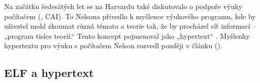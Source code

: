Na začátku šedesátých let se na Harvardu také diskutovalo o podpoře výuky počítačem (, CAI). To Nelsona přivedlo k myšlence výukového programu, kde by uživatel mohl zkoumat různá témata a teorie tak, že by procházel síť informací -- „program tisíce teorií.“ Tento koncept pojmenoval jako „hypertext“ \autocites[71]{Barnet2014}[1/26]{LitMachines}. Myšlenky hypertextu pro výuku s počítačem Nelson rozvedl později v článku  ().

\subsection{ELF a hypertext}
\label{sec:elf}


